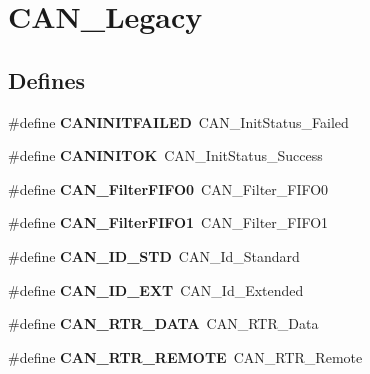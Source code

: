 \hypertarget{group__CAN__Legacy}{
\section{CAN\_\-Legacy}
\label{group__CAN__Legacy}
}
\subsection*{Defines}
\begin{DoxyCompactItemize}
\item 
\hypertarget{group__CAN__Legacy_ga0539a9e5a898fcd71c4dcb7e341e4b86}{
\#define {\bfseries CANINITFAILED}~CAN\_\-InitStatus\_\-Failed}
\label{group__CAN__Legacy_ga0539a9e5a898fcd71c4dcb7e341e4b86}

\item 
\hypertarget{group__CAN__Legacy_ga14cba0b5b506be73e2f45c732f8e54cb}{
\#define {\bfseries CANINITOK}~CAN\_\-InitStatus\_\-Success}
\label{group__CAN__Legacy_ga14cba0b5b506be73e2f45c732f8e54cb}

\item 
\hypertarget{group__CAN__Legacy_ga1b3d041dff9fed4dad75ed2a4a0e27e0}{
\#define {\bfseries CAN\_\-FilterFIFO0}~CAN\_\-Filter\_\-FIFO0}
\label{group__CAN__Legacy_ga1b3d041dff9fed4dad75ed2a4a0e27e0}

\item 
\hypertarget{group__CAN__Legacy_gada8f9b3a9c88f36539aaeb457039e666}{
\#define {\bfseries CAN\_\-FilterFIFO1}~CAN\_\-Filter\_\-FIFO1}
\label{group__CAN__Legacy_gada8f9b3a9c88f36539aaeb457039e666}

\item 
\hypertarget{group__CAN__Legacy_ga284ca16658deb9d0c21f4ddc6db14833}{
\#define {\bfseries CAN\_\-ID\_\-STD}~CAN\_\-Id\_\-Standard}
\label{group__CAN__Legacy_ga284ca16658deb9d0c21f4ddc6db14833}

\item 
\hypertarget{group__CAN__Legacy_ga5f6fdd1dc3d312af1ac30e2eee15d6f0}{
\#define {\bfseries CAN\_\-ID\_\-EXT}~CAN\_\-Id\_\-Extended}
\label{group__CAN__Legacy_ga5f6fdd1dc3d312af1ac30e2eee15d6f0}

\item 
\hypertarget{group__CAN__Legacy_gab1e89074b4fcfebf81c323909625b0d0}{
\#define {\bfseries CAN\_\-RTR\_\-DATA}~CAN\_\-RTR\_\-Data}
\label{group__CAN__Legacy_gab1e89074b4fcfebf81c323909625b0d0}

\item 
\hypertarget{group__CAN__Legacy_gab15c649e3e497c6d1145bb98ff7f3f04}{
\#define {\bfseries CAN\_\-RTR\_\-REMOTE}~CAN\_\-RTR\_\-Remote}
\label{group__CAN__Legacy_gab15c649e3e497c6d1145bb98ff7f3f04}


\end{DoxyCompactItemize}
